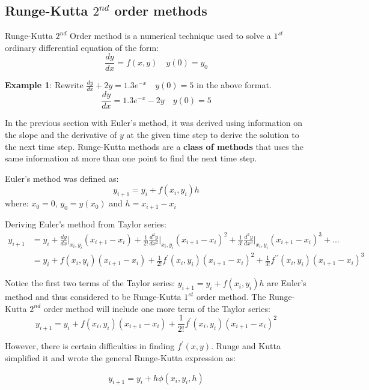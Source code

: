 \documentclass[10pt,a4paper]{article}
\begin{document}
\subsection{Runge-Kutta $2^{nd}$ order methods}

Runge-Kutta $2^{nd}$ Order method is a numerical technique used to solve a $1^{st}$ ordinary
differential equation of the form: 
$$
    \frac{dy}{dx}=f(x,y) \quad y(0)=y_0
$$

\textbf{Example 1}: Rewrite $\frac{dy}{dx}+2y=1.3e^{-x} \quad y(0)=5$ in the above format.
$$
    \frac{dy}{dx}=1.3e^{-x}-2y \quad y(0) = 5
$$

In the previous section with Euler's method, it was derived using information on the slope and the
derivative of $y$ at the given time step to derive the solution to the next time step. Runge-Kutta
methods are a \textbf{class of methods} that uses the same information at more than one point to
find the next time step. \par 

Euler's method was defined as:
$$
    y_{i+1} = y_i + f(x_i,y_i)h
$$
where: $x_0 = 0$, $y_0 = y(x_0)$ and $h=x_{i+1}-x_i$ \par 

Deriving Euler's method from Taylor series:
\begin{equation*}
    \begin{aligned}
        y_{i+1}&=y_i + \frac{dy}{dx}\rvert_{x_i,y_i} (x_{i+1}-x_i) + \frac{1}{2!}\frac{d^2 y}{dx^2}\rvert_{x_i,y_i} (x_{i+1}-x_i)^2 + \frac{1}{3!}\frac{d^3 y}{dx^3}\rvert_{x_i,y_i} (x_{i+1}-x_i)^3 + ... \\
        &= y_i + f(x_i,y_i)(x_{i+1}-x_i)+\frac{1}{2!}f^{\prime}(x_i,y_i)(x_{i+1}-x_i)^2+\frac{1}{3!}f^{\prime \prime}(x_i,y_i)(x_{i+1}-x_i)^3
    \end{aligned}
\end{equation*}

Notice the first two terms of the Taylor series: $y_{i+1}=y_i +f(x_i,y_i)h$ are Euler's method and
thus considered to be Runge-Kutta $1^{st}$ order method. The Runge-Kutta $2^{nd}$ order method will
include one more term of the Taylor series: 
$$
    y_{i+1} =  y_i + f(x_i,y_i)(x_{i+1}-x_i)+\frac{1}{2!}f^{\prime}(x_i,y_i)(x_{i+1}-x_i)^2
$$

However, there is certain difficulties in finding $f^{\prime}(x,y)$. Runge and Kutta simplified it
and wrote the general Runge-Kutta expression as: 

\begin{tcolorbox}[breakable,colback=white,colframe=black,width=\dimexpr\textwidth+12mm\relax,enlarge left by=-6mm]
$$
    y_{i+1}=y_i+h\phi(x_i,y_i,h)
$$
\end{tcolorbox}
\end{document}
